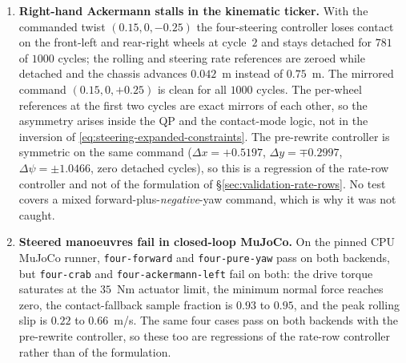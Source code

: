 \documentclass[10pt]{article}
\begin{document}
\begin{enumerate}

\item \textbf{Right-hand Ackermann stalls in the kinematic ticker.} With the
  commanded twist $(0.15, 0, -0.25)$ the four-steering controller loses contact
  on the front-left and rear-right wheels at cycle~$2$ and stays detached for
  $781$ of $1000$ cycles; the rolling and steering rate references are zeroed
  while detached and the chassis advances $0.042$~m instead of $0.75$~m. The
  mirrored command $(0.15, 0, +0.25)$ is clean for all $1000$ cycles. The
  per-wheel references at the first two cycles are exact mirrors of each other,
  so the asymmetry arises inside the QP and the contact-mode logic, not in the
  inversion of \eqref{eq:steering-expanded-constraints}. The pre-rewrite
  controller is symmetric on the same command ($\Delta x = +0.5197$,
  $\Delta y = \mp 0.2997$, $\Delta\psi = \pm 1.0466$, zero detached cycles), so
  this is a regression of the rate-row controller and not of the formulation of
  \S\ref{sec:validation-rate-rows}. No test covers a mixed
  forward-plus-\emph{negative}-yaw command, which is why it was not caught.

\item \textbf{Steered manoeuvres fail in closed-loop MuJoCo.} On the pinned CPU
  MuJoCo runner, \texttt{four-forward} and \texttt{four-pure-yaw} pass on both
  backends, but \texttt{four-crab} and \texttt{four-ackermann-left} fail on
  both: the drive torque saturates at the $35$~Nm actuator limit, the minimum
  normal force reaches zero, the contact-fallback sample fraction is $0.93$ to
  $0.95$, and the peak rolling slip is $0.22$ to $0.66$~m/s. The same four cases
  pass on both backends with the pre-rewrite controller, so these too are
  regressions of the rate-row controller rather than of the formulation.

\end{enumerate}
\end{document}
